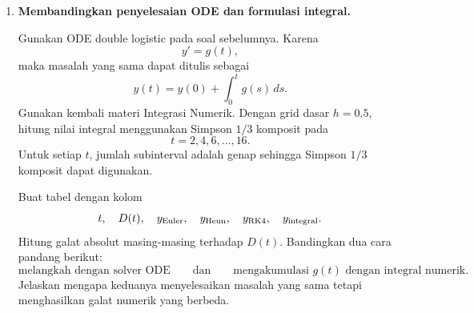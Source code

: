 \documentclass[book,english,noindex,lean,nobackpage,nocopyright,noupdate,nofiglist,notablist]{enacom}
\begin{document}
\begin{enumerate}
Diberikan fungsi
\[
D(t)
=
\frac{40}{1+e^{-(t-4)}}
+
\frac{60}{1+e^{-0.5(t-10)}},
\qquad
0\le t\le16.
\]
Fungsi ini merupakan jumlah dua kurva logistik dengan pusat pertumbuhan dan laju yang berbeda.

\begin{enumerate}
\item Turunkan $D(t)$ dan verifikasi bahwa
\[
D'(t)
=
\frac{40e^{-(t-4)}}{(1+e^{-(t-4)})^2}
+
\frac{30e^{-0.5(t-10)}}{(1+e^{-0.5(t-10)})^2}.
\]
\item Definisikan
\[
g(t)=D'(t)
\]
dan bentuk masalah nilai awal
\[
y'=g(t),
\qquad
y(0)=D(0).
\]
\item Selesaikan ODE tersebut dengan Euler, Heun, dan RK4 menggunakan $h=0.5$.
\item Bandingkan ketiga solusi numerik dengan nilai langsung $D(t)$. Sajikan grafik kurva dan grafik galat absolut.
\item Plot $g(t)$. Hubungkan dua puncak pada laju perubahan dengan dua komponen logistik pada $D(t)$.
\end{enumerate}

Berbeda dari logistik tunggal, ruas kanan hasil penurunan double logistic merupakan jumlah dua kontribusi nonlinear dan secara umum tidak dapat disederhanakan menjadi satu bentuk $r\,y(1-y/K)$. Jika dua komponen dipaksa dieliminasi agar diperoleh bentuk autonomous $y'=F(y)$, bentuknya menjadi lebih rumit. Bahkan pada kasus kedua laju sama, dengan substitusi $z=e^{-rt}$ diperoleh relasi kuadrat
\[
D\,y\,z^2+(B\,y-C)z+(y-K)=0,
\]
sehingga $z$ sebagai fungsi $y$ melibatkan akar kuadrat. Untuk praktikum ini gunakan bentuk $y'=g(t)$ yang diperoleh langsung dari turunan $D(t)$.

\item \textbf{Membandingkan penyelesaian ODE dan formulasi integral.}

Gunakan ODE double logistic pada soal sebelumnya. Karena
\[
y'=g(t),
\]
maka masalah yang sama dapat ditulis sebagai
\[
y(t)=y(0)+\int_0^t g(s)\,ds.
\]
Gunakan kembali materi Integrasi Numerik. Dengan grid dasar $h=0.5$, hitung nilai integral menggunakan Simpson $1/3$ komposit pada
\[
t=2,4,6,\ldots,16.
\]
Untuk setiap $t$, jumlah subinterval adalah genap sehingga Simpson $1/3$ komposit dapat digunakan.

Buat tabel dengan kolom
\[
t,\quad D(t),\quad y_{\rm Euler},\quad y_{\rm Heun},
\quad y_{\rm RK4},\quad y_{\rm integral}.
\]
Hitung galat absolut masing-masing terhadap $D(t)$. Bandingkan dua cara pandang berikut:
\[
\text{melangkah dengan solver ODE}
\qquad\text{dan}\qquad
\text{mengakumulasi }g(t)\text{ dengan integral numerik}.
\]
Jelaskan mengapa keduanya menyelesaikan masalah yang sama tetapi menghasilkan galat numerik yang berbeda.

\end{enumerate}
\end{document}
